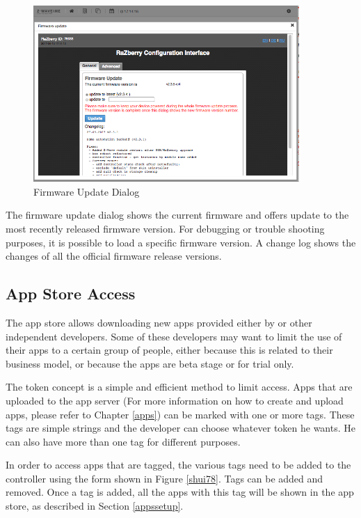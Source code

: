 \begin{figure}
\begin{center}
\includegraphics[width=0.9\textwidth]{pngs/cap4/shui77.png}
\caption{Firmware Update Dialog}
\label{shui77}
\end{center}
\end{figure}

The firmware update dialog shows the current firmware and offers update to the most recently 
released firmware version. For debugging or trouble shooting purposes, it is possible to load 
a specific firmware version. A change log shows the changes of all the official firmware 
release versions.

\subsection{App Store Access}

The app store allows downloading new apps provided either by \zwaveme or other independent 
developers. Some of these developers may want to limit the use of their apps to a 
certain group of people, either because this is related to their business model, or 
because the apps are beta stage or for trial only.

The token concept is a simple and efficient method to limit access. Apps that are uploaded 
to the app server (For more information on how to create and upload apps, please refer 
to Chapter \ref{apps}) can be marked with one or more tags. These tags are simple strings 
and the developer can choose whatever token he wants. He can also have more than one tag 
for different purposes.

In order to access apps that are tagged, the various tags need to be added to the 
controller using the form shown in Figure \ref{shui78}. Tags can be added and removed. 
Once a tag is added, all the apps with this tag will be shown in the app store, as 
described in Section \ref{appssetup}.


